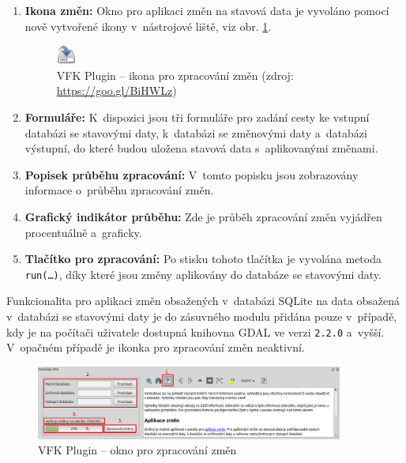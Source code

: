 \documentclass[a4paper,12pt,oneside]{book}
\begin{document}
\begin{enumerate}
\item \textbf{Ikona změn:} Okno pro aplikaci změn na stavová data je
  vyvoláno pomocí nově vytvořené ikony v~nástrojové liště, viz
  obr. \ref{l_ikona_zmen}.

\begin{figure}[htb]
\centering
\includegraphics[scale=0.9]{images/applyChanges.png}
\caption[VFK Plugin -- ikona pro zpracování změn]{VFK Plugin -- ikona pro zpracování změn (zdroj: \url{https://goo.gl/BiHWLz})}
\label{l_ikona_zmen}
\end{figure} 
 
\item \textbf{Formuláře:} K~dispozici jsou tři formuláře pro zadání
  cesty ke vstupní databázi se stavovými daty, k~databázi se změnovými
  daty a~databázi výstupní, do které budou uložena stavová data
  s~aplikovanými změnami.
 
\item \textbf{Popisek průběhu zpracování:} V~tomto popisku jsou
  zobrazovány informace o~průběhu zpracování změn.
 
\item \textbf{Grafický indikátor průběhu:} Zde je průběh zpracování
  změn vyjádřen procentuálně a~graficky.
 
\item \textbf{Tlačítko pro zpracování:} Po stisku tohoto tlačítka
  je vyvolána metoda \texttt{run(\dots)}, díky které jsou změny
  aplikovány do databáze se stavovými daty.
 
\end{enumerate}

Funkcionalita pro aplikaci změn obsažených v~databázi SQLite na data
obsažená v~databázi se stavovými daty je do zásuvného modulu přidána
pouze v~případě, kdy je na počítači uživatele dostupná knihovna GDAL
ve verzi \texttt{2.2.0} a~vyšší. V~opačném případě je ikonka pro
zpracování změn neaktivní.

\begin{figure}[htb]
\centering
\includegraphics[width=0.9\textwidth]{images/vfkPlugin-zmeny.png}
\caption[VFK Plugin -- okno pro zpracování změn]{VFK Plugin -- okno pro zpracování změn}
\label{l_plugin_zmeny}
\end{figure}
\end{document}
